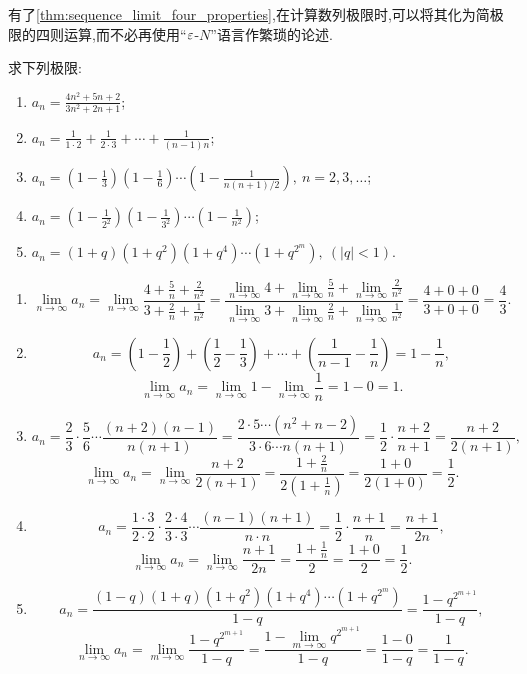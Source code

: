 有了\autoref{thm:sequence_limit_four_properties},在计算数列极限时,可以将其化为简极限的四则运算,而不必再使用“$\varepsilon$-$N$”语言作繁琐的论述.
\begin{exercise}[1.2.8]
    求下列极限:
    \begin{enumerate}[(1)]
        \item $a_n = \frac{4n^2 + 5n + 2}{3n^2 + 2n + 1}$;
        \item $a_n = \frac{1}{1 \cdot 2} + \frac{1}{2 \cdot 3} + \cdots + \frac{1}{(n-1)n}$;
        \item $a_n = \left(1 - \frac{1}{3}\right) \left(1 - \frac{1}{6}\right) \cdots \left(1 - \frac{1}{n(n+1)/2}\right), \ n=2, 3, \ldots$;
        \item $a_n = \left(1 - \frac{1}{2^2}\right) \left(1 - \frac{1}{3^2}\right) \cdots \left(1 - \frac{1}{n^2}\right)$;
        \item $a_n = (1+q)(1+q^2)(1+q^4) \cdots (1+q^{2^m}), \ (|q|<1)$.
    \end{enumerate}
\end{exercise}

\begin{solution}
    \begin{enumerate}[(1)]
        \item $$\lim_{n \to \infty} a_n = \lim_{n \to \infty} \frac{4 + \frac{5}{n} + \frac{2}{n^2}}{3 + \frac{2}{n} + \frac{1}{n^2}} = \frac{\displaystyle \lim_{n \to \infty} 4 + \lim_{n \to \infty} \frac{5}{n} + \lim_{n \to \infty} \frac{2}{n^2}}{\displaystyle \lim_{n \to \infty} 3 + \lim_{n \to \infty} \frac{2}{n} + \lim_{n \to \infty} \frac{1}{n^2}} = \frac{4 + 0 + 0}{3 + 0 + 0} = \frac{4}{3}.$$
        \item $$a_n = \left( 1 - \frac{1}{2} \right) + \left( \frac{1}{2} - \frac{1}{3} \right) + \cdots + \left( \frac{1}{n-1} - \frac{1}{n} \right) = 1 - \frac{1}{n},$$
              $$\lim_{n \to \infty} a_n = \lim_{n \to \infty} 1 - \lim_{n \to \infty} \frac{1}{n} = 1 - 0 = 1.$$
        \item $$a_n = \frac{2}{3} \cdot \frac{5}{6} \cdots \frac{(n+2)(n-1)}{n(n+1)} = \frac{2 \cdot 5 \cdots (n^2 + n - 2)}{3 \cdot 6 \cdots n(n+1)} = \frac{1}{2} \cdot \frac{n+2}{n+1} = \frac{n+2}{2(n+1)},$$
              $$\lim_{n \to \infty} a_n = \lim_{n \to \infty} \frac{n+2}{2(n+1)} = \frac{1 + \frac{2}{n}}{2(1 + \frac{1}{n})} = \frac{1 + 0}{2(1 + 0)} = \frac{1}{2}.$$
        \item $$a_n = \frac{1 \cdot 3}{2 \cdot 2} \cdot \frac{2 \cdot 4}{3 \cdot 3} \cdots \frac{(n-1)(n+1)}{n \cdot n} = \frac{1}{2} \cdot \frac{n+1}{n} = \frac{n+1}{2n},$$
              $$\lim_{n \to \infty} a_n = \lim_{n \to \infty} \frac{n+1}{2n} = \frac{1 + \frac{1}{n}}{2} = \frac{1 + 0}{2} = \frac{1}{2}.$$
        \item $$a_n = \frac{(1-q)(1+q)(1+q^2)(1+q^4) \cdots (1+q^{2^m})}{1-q} = \frac{1-q^{2^{m+1}}}{1-q},$$
              $$\lim_{n \to \infty} a_n = \lim_{m \to \infty} \frac{1-q^{2^{m+1}}}{1-q} = \frac{\displaystyle 1 - \lim_{m \to \infty} q^{2^{m+1}}}{1-q} = \frac{1 - 0}{1-q} = \frac{1}{1-q}.$$
    \end{enumerate}
\end{solution}

